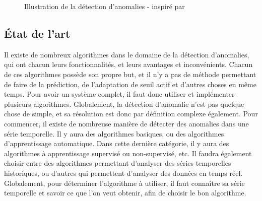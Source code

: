 \documentclass[paper=a4, fontsize=11pt]{scrartcl}
\begin{document}
\begin{figure}[H]
  \centering
  \hfill
  \caption{Illustration de la détection d'anomalies - inspiré par \cite{noauthor_introduction_2019}}
  \label{f-illustrationsAD}
\end{figure}

\subsection{État de l'art}

Il existe de nombreux algorithmes dans le domaine de la détection d'anomalies, qui ont chacun leurs fonctionnalités, et leurs avantages et inconvénients. Chacun de ces algorithmes possède son propre but, et il n'y a pas de méthode permettant de faire de la prédiction, de l'adaptation de seuil actif et d'autres choses en même temps. Pour avoir un système complet, il faut donc utiliser et implémenter plusieurs algorithmes. Globalement, la détection d'anomalie n'est pas quelque chose de simple, et sa résolution est donc par définition complexe également. \newline
Pour commencer, il existe de nombreuse manière de détecter des anomalies dans une série temporelle. Il y aura des algorithmes basiques, ou des algorithmes d'apprentissage automatique. Dans cette dernière catégorie, il y aura des algorithmes à apprentissage supervisé ou non-supervisé, etc. Il faudra également choisir entre des algorithmes permettant d'analyser des séries temporelles historiques, ou d'autres qui permettent d'analyser des données en temps réel.
Globalement, pour déterminer l'algorithme à utiliser, il faut connaître sa série temporelle et savoir ce que l'on veut obtenir, afin de choisir le bon algorithme.
\end{document}
